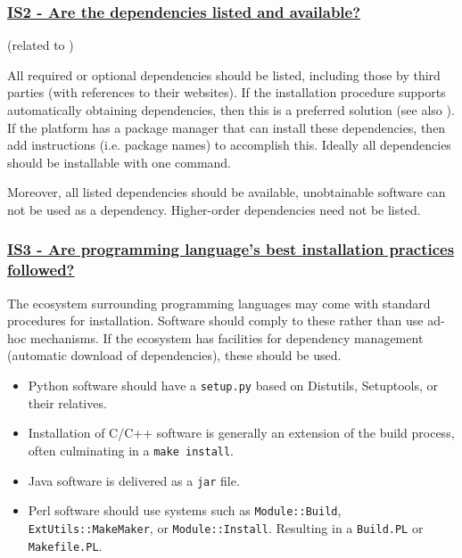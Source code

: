 \documentclass[a4paper,11pt]{article}
\newcommand{\criterion}[2]{\subsubsection*{\underline{#1 - #2}}\label{id:#1}}
\newcommand\CheckTable{%
  \begin{tabular}{ccccc}
    No & Minimal & Adequate & Good & Perfect \\
    0 & 1 & 2 & 3 & 4 \\
    \hline
    $\square$ & $\square$ & $\square$ & $\square$ & $\square$ \\
  \end{tabular}%
}
\newcommand{\refcrit}[1]{%
 \framebox[1.1\width]{\hyperref[id:#1]{#1}}
}
\begin{document}

\newcommand{\isTwoID}{IS2}
\newcommand{\isTwoText}{Are the dependencies listed and available?}
\criterion{\isTwoID}{\isTwoText}
(related to \refcrit{B3})

All required or optional dependencies should be listed, including those by
third parties (with references to their websites). If the installation
procedure supports automatically obtaining dependencies, then this is a
preferred solution (see also \refcrit{IS3}). If the platform has a package manager that
can install these dependencies, then add instructions (i.e. package names) to
accomplish this. Ideally all dependencies should be installable with one
command.

Moreover, all listed dependencies should be available, unobtainable software
can not be used as a dependency. Higher-order dependencies need not be listed.
%
%


\newcommand{\isThreeID}{IS3}
\newcommand{\isThreeText}{Are programming language's best installation practices followed?}
\criterion{\isThreeID}{\isThreeText}

The ecosystem surrounding programming languages may come with standard
procedures for installation. Software should comply to these rather than use
ad-hoc mechanisms. If the ecosystem has facilities for dependency management
(automatic download of dependencies), these should be used.

\begin{itemize}
 \item Python software should have a \texttt{setup.py} based on Distutils, Setuptools, or their relatives.
 \item Installation of C/C++ software is generally an extension of the build process, often culminating in a \texttt{make install}.
 \item Java software is delivered as a \texttt{jar} file.
 \item Perl software should use systems such as \texttt{Module::Build}, \texttt{ExtUtils::MakeMaker}, or \texttt{Module::Install}. Resulting in a \texttt{Build.PL} or \texttt{Makefile.PL}.
\end{itemize}
\end{document}
